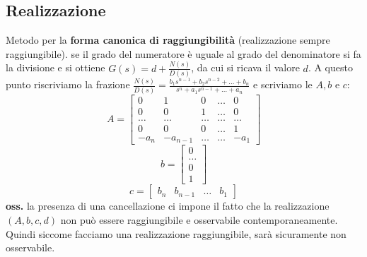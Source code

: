 \begin{landscape}
\begin{multicols*}{3}
    \section{Realizzazione}
    Metodo per la \textbf{forma canonica di raggiungibilità} (realizzazione sempre raggiungibile).
    se il grado del numeratore è uguale al grado del denominatore si fa la divisione e si ottiene $G(s) = d + \frac{N(s)}{D(s)}$, da cui si ricava il valore $d$. A questo punto riscriviamo la frazione $\frac{N(s)}{D(s)} = \frac{ b_1 s^{n-1} + b_2 s^{n-2} + \dots + b_n }{ s^n + a_1 s^{n-1} + \dots + a_n }$ e scriviamo le $A, b$ e $c$:
    \[
        A=\left[\begin{matrix}
            0 & 1 & 0 & \dots & 0 \\
            0 & 0 & 1 & \dots & 0 \\
            \dots & \dots &\dots&\dots&\dots\\
            0 & 0 & 0 & \dots & 1\\
            -a_n & -a_{n-1} & \dots & \dots & -a_1
        \end{matrix}\right]
    \]
    \[
        b=\left[\begin{matrix}
            0\\\dots\\0\\1
        \end{matrix}\right]
    \]
    \[
        c=\left[\begin{matrix}
            b_n & b_{n-1} & \dots & b_1
        \end{matrix}\right]
    \]
    \textbf{oss.} la presenza di una cancellazione ci impone il fatto che la realizzazione
    $ (A, b, c, d)$ non può essere raggiungibile e osservabile contemporaneamente. Quindi siccome facciamo una realizzazione raggiungibile, sarà sicuramente non osservabile.

\end{multicols*}
\end{landscape}
